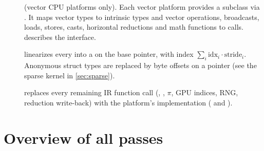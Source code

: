 \begin{description}
  \item[] (vector CPU platforms only). Each vector platform
    provides a subclass via . It maps vector types
    to intrinsic types and vector operations, broadcasts, loads, stores, casts,
    horizontal reductions and math functions to  calls.
     describes the interface.
  \item[] linearizes every  into a  on the
    base pointer, with index $\sum_i \text{idx}_i\cdot\text{stride}_i$. Anonymous struct
    types are replaced by byte offsets on a  pointer (see the sparse kernel
    in \cref{sec:sparse}).
  \item[] replaces every remaining IR function call
    (, , $\pi$, GPU indices, RNG, reduction write-back) with the
    platform's implementation ( and
    ).
\end{description}

\section{Overview of all passes}

